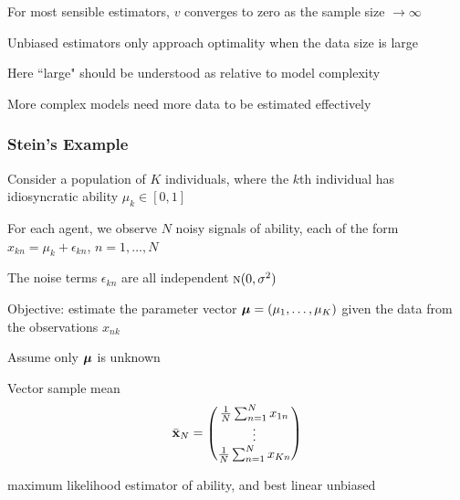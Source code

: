 \begin{frame}

    \vspace{2em}
    For most sensible estimators, $v$ converges to zero as the sample size $\to
    \infty$
    
    Unbiased estimators only approach optimality
    when the data size is large
    
    \vspace{.7em}
    Here ``large" should be understood as relative
    to model complexity
    
    More complex models need more data to be estimated
    effectively
    
\end{frame}

\begin{frame}\frametitle{Stein's Example}

    \vspace{2em}
    Consider a population of
    $K$ individuals, where the $k$th individual has idiosyncratic ability
    $\mu_k \in [0, 1]$
    
    For each agent, we observe $N$ noisy signals of
    ability, each of the form $x_{kn} = \mu_k + \epsilon_{kn}$, $n=1, \ldots, N$
    
    The noise terms $\epsilon_{kn}$ are all independent $\textrm{\sc n}(0, \sigma^2)$
   
   \vspace{.7em}
    Objective: estimate the parameter vector ${\boldsymbol \mu} = (\mu_1, \ldots, \mu_K)$ 
    given the data from the observations $x_{nk}$
    
    Assume
    only ${\boldsymbol \mu}$ is unknown
    
\end{frame}

\begin{frame}

    \vspace{2em}
    Vector sample mean
    \begin{equation*}
    \bar {{\mathbf x}}_N 
    =
    \begin{pmatrix}
        \frac{1}{N} \sum_{n=1}^N x_{1n}
        \\
        \vdots
        \\
        \frac{1}{N} \sum_{n=1}^N x_{Kn}
    \end{pmatrix}
    \end{equation*}
    
    maximum likelihood estimator of ability, and best
    linear unbiased

\end{frame}

